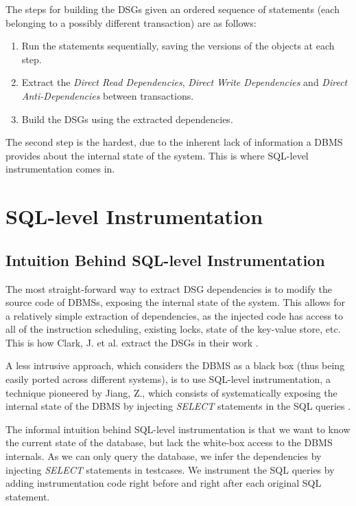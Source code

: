 The steps for building the DSGs given an ordered sequence of statements (each belonging to a possibly different transaction) are as follows:
\begin{enumerate}
    \item Run the statements sequentially, saving the versions of the objects at each step.
    \item Extract the \textit{Direct Read Dependencies}, \textit{Direct Write Dependencies} and \textit{Direct Anti-Dependencies} between transactions.
    \item Build the DSGs using the extracted dependencies.
\end{enumerate}

The second step is the hardest, due to the inherent lack of information a DBMS provides about the internal state of the system. This is where SQL-level instrumentation comes in.

\section{SQL-level Instrumentation}

\subsection{Intuition Behind SQL-level Instrumentation}

The most straight-forward way to extract DSG dependencies is to modify the source code of DBMSs, exposing the internal state of the system. This allows for a relatively simple extraction of dependencies, as the injected code has access to all of the instruction scheduling, existing locks, state of the key-value store, etc. This is how Clark, J. et al. extract the DSGs in their work \cite{clark2024validating}.

A less intrusive approach, which considers the DBMS as a black box (thus being easily ported across different systems), is to use SQL-level instrumentation, a technique pioneered by Jiang, Z., which consists of systematically exposing the internal state of the DBMS by injecting \textit{SELECT} statements in the SQL queries \cite{jiang2023detecting}.

The informal intuition behind SQL-level instrumentation is that we want to know the current state of the database, but lack the white-box access to the DBMS internals. As we can only query the database, we infer the dependencies by injecting \textit{SELECT} statements in testcases. We instrument the SQL queries by adding instrumentation code right before and right after each original SQL statement.

